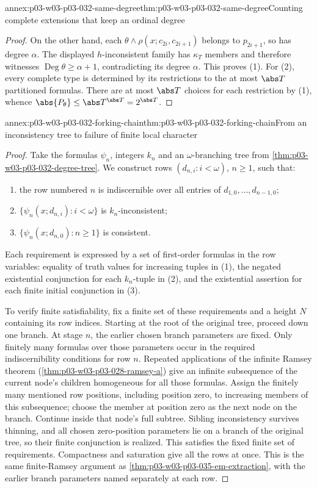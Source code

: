 \begin{annexitem}{annex:p03-w03-p03-032-same-degree}{thm:p03-w03-p03-032-same-degree}{Counting complete extensions that keep an ordinal degree}
\begin{proof}
On the other hand, each
\(\theta\wedge\rho(x;c_{2i},c_{2i+1})\) belongs to \(p_{2i+1}\), so
has degree \(\alpha\).  The displayed \(h\)-inconsistent family has
\(\kappa_T\) members and therefore witnesses
\(\operatorname{Deg}\theta\geq\alpha+1\), contradicting its degree
\(\alpha\).  This proves (1).  For (2), every complete type is determined
by its restrictions to the at most \(\abs T\) partitioned formulas.
There are at most \(\abs T\) choices for each restriction by (1), whence
\(\abs{P_\theta}\leq\abs T^{\abs T}=2^{\abs T}\).
\end{proof}
\end{annexitem}

\begin{annexitem}{annex:p03-w03-p03-032-forking-chain}{thm:p03-w03-p03-032-forking-chain}{From an inconsistency tree to failure of finite local character}
\begin{proof}
Take the formulas \(\psi_n\), integers \(k_n\) and an
\(\omega\)-branching tree from \cref{thm:p03-w03-p03-032-degree-tree}.
We construct rows \((d_{n,i}:i<\omega)\), \(n\geq1\), such that:
\begin{enumerate}
  \item the row numbered \(n\) is indiscernible over all entries of
        \(d_{1,0},\ldots,d_{n-1,0}\);
  \item \(\{\psi_n(x;d_{n,i}):i<\omega\}\) is \(k_n\)-inconsistent;
  \item \(\{\psi_n(x;d_{n,0}):n\geq1\}\) is consistent.
\end{enumerate}
Each requirement is expressed by a set of first-order formulas in the row
variables: equality of truth values for increasing tuples in (1), the
negated existential conjunction for each \(k_n\)-tuple in (2), and the
existential assertion for each finite initial conjunction in (3).

To verify finite satisfiability, fix a finite set of these requirements
and a height \(N\) containing its row indices.  Starting at the root of
the original tree, proceed down one branch.  At stage \(n\), the earlier
chosen branch parameters are fixed.  Only finitely many formulas over
those parameters occur in the required indiscernibility conditions for
row \(n\).  Repeated applications of the infinite Ramsey theorem
(\cref{thm:p03-w03-p03-028-ramsey-a}) give an infinite subsequence of the
current node's children homogeneous for all those formulas.  Assign the
finitely many mentioned row positions, including position zero, to
increasing members of this subsequence; choose the member at position
zero as the next node on the branch.  Continue inside that node's full
subtree.  Sibling inconsistency survives thinning, and all chosen
zero-position parameters lie on a branch of the original tree, so their
finite conjunction is realized.  This satisfies the fixed finite set of
requirements.  Compactness and saturation give all the rows at once.
This is the same finite-Ramsey argument as
\cref{thm:p03-w03-p03-035-em-extraction}, with the earlier branch
parameters named separately at each row.


\end{proof}
\end{annexitem}
